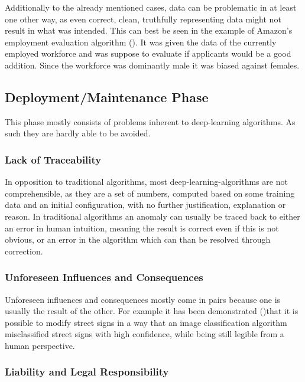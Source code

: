 Additionally to the already mentioned cases, data can be problematic 
in at least one other way, as even correct, clean, truthfully representing data might not result in what was intended.
This can best be seen in the example of Amazon's employment evaluation algorithm (\cite{Higginbottom2018}). It was given the data of the currently employed workforce and was suppose to evaluate if applicants would be a good addition.
Since the workforce was dominantly male it was biased against females.

\subsection{Deployment/Maintenance Phase}
This phase mostly consists of problems inherent to
deep-learning algorithms. As such they are hardly 
able to be avoided.

\subsubsection{Lack of Traceability}

In opposition to traditional algorithms, most deep-learning-algorithms are not comprehensible, as they are a set of numbers, computed based on some training data and an initial configuration, with no further justification, explanation or reason. In traditional algorithms an anomaly can usually be traced back to either an error in human intuition, meaning the result is correct even if this is not obvious, or an error in the algorithm which can than be resolved through correction. 

\subsubsection{Unforeseen Influences and Consequences}

Unforeseen influences and consequences mostly come in pairs because one is usually the result of the other. For example it has been demonstrated (\cite{Eykholt2017})that it is possible to modify street signs in a way that an image classification algorithm misclassified street signs with high confidence, while being still legible from a human perspective.

\subsubsection{Liability and Legal Responsibility}

